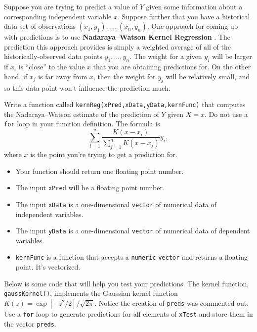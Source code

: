 \documentclass[12pt,krantz2]{krantz}
\providecommand{\tightlist}{%
  \setlength{\itemsep}{0pt}\setlength{\parskip}{0pt}}
\begin{document}
Suppose you are trying to predict a value of \(Y\) given some information about a corresponding independent variable \(x\). Suppose further that you have a historical data set of observations \((x_1, y_1), \ldots, (x_n,y_n)\). One approach for coming up with predictions is to use \textbf{Nadaraya--Watson Kernel Regression} \citep{Nadaraya} \citep{Watson}. The prediction this approach provides is simply a weighted average of all of the historically-observed data points \(y_1, \ldots, y_n\). The weight for a given \(y_i\) will be larger if \(x_i\) is ``close'' to the value \(x\) that you are obtaining predictions for. On the other hand, if \(x_j\) is far away from \(x\), then the weight for \(y_j\) will be relatively small, and so this data point won't influence the prediction much.

Write a function called \texttt{kernReg(xPred,xData,yData,kernFunc)} that computes the Nadaraya--Watson estimate of the prediction of \(Y\) given \(X=x\). Do not use a \texttt{for} loop in your function definition. The formula is
\begin{equation} 
\sum_{i=1}^n \frac{K(x-x_i)}{\sum_{j=1}^n K(x-x_j) } y_i,
\end{equation}
where \(x\) is the point you're trying to get a prediction for.

\begin{itemize}
\tightlist
\item
  Your function should return one floating point number.
\item
  The input \texttt{xPred} will be a floating point number.
\item
  The input \texttt{xData} is a one-dimensional \texttt{vector} of numerical data of independent variables.
\item
  The input \texttt{yData} is a one-dimensional \texttt{vector} of numerical data of dependent variables.
\item
  \texttt{kernFunc} is a function that accepts a \texttt{numeric} \texttt{vector} and returns a floating point. It's vectorized.
\end{itemize}

Below is some code that will help you test your predictions. The kernel function, \texttt{gaussKernel()}, implements the Gaussian kernel function \(K(z) = \exp[-z^2/2]/\sqrt{2\pi}\). Notice the creation of \texttt{preds} was commented out. Use a \texttt{for} loop to generate predictions for all elements of \texttt{xTest} and store them in the vector \texttt{preds}.
\end{document}
